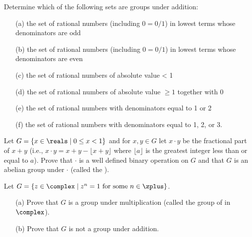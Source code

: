 
\begin{exercise}
	Determine which of the following sets are groups under addition:
	\begin{enumerate}
		\item[(a)] the set of rational numbers (including $0=0/1$) 
		in lowest terms whose denominators are odd
		
		\item[(b)] the set of rational numbers (including $0=0/1$) 
		in lowest terms whose denominators are even
		
		\item[(c)] the set of rational numbers of absolute value < 1
		
		\item[(d)] the set of rational numbers of absolute value 
		$\geq 1$ together with 0
		
		\item[(e)] the set of rational numbers with denominators 
		equal to 1 or 2
		
		\item[(f)] the set of rational numbers with denominators 
		equal to 1, 2, or 3.
	\end{enumerate}
\end{exercise}


\begin{exercise}
	Let $G = \{ x \in \reals \mid 0 \leq x < 1 \}$ and for $x,y \in 
	G$ let $x \cdot y$ be the fractional part of $x+y$ (i.e., $x 
	\cdot y = x + y - \lfloor x + y \rfloor$ where $\lfloor a 
	\rfloor$ is the greatest integer less than or equal to $a$). 
	Prove that $\cdot$ is a well 
	defined binary operation on $G$ and that $G$ is an abelian 
	group under $\cdot$ (called the ).
\end{exercise}


\begin{exercise}
	Let $G = \{ z \in \complex \mid z^n = 1 \text{ for some } n \in 
	\zplus \}$.
	\begin{enumerate}
		\item[(a)] Prove that $G$ is a group under multiplication 
		(called the group of  in $\complex$).
		
		\item[(b)] Prove that $G$ is not a group under addition.
	\end{enumerate}
\end{exercise}

